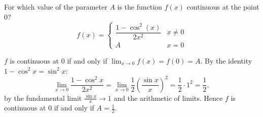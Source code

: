 
\begin{question}
For which value of the parameter $A$ is the function $f(x)$ continuous at the point $0$?
\[ f(x)=\begin{cases}\dfrac{1-\cos^2(x)}{2x^2} & x\neq0\\ A & x=0\end{cases} \]
\end{question}

\begin{solution}
$f$ is continuous at $0$ if and only if $\lim_{x\to0}f(x)=f(0)=A$. By the identity $1-\cos^2x=\sin^2x$:
\[ \lim_{x\to0}\frac{1-\cos^2x}{2x^2}=\lim_{x\to0}\frac12\left(\frac{\sin x}{x}\right)^2=\frac12\cdot1^2=\frac12, \]
by the fundamental limit $\frac{\sin x}{x}\to1$ and the arithmetic of limits. Hence $f$ is continuous at $0$ if and only if $\boxed{A=\frac12}$.
\end{solution}

